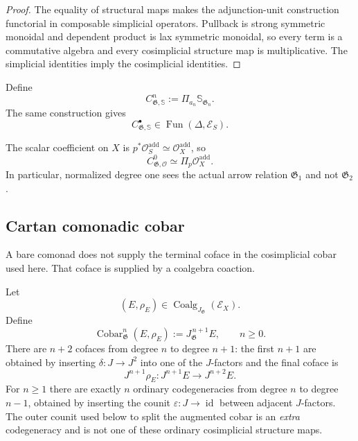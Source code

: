 \begin{proof}
The equality of structural maps makes the adjunction-unit construction
functorial in composable simplicial operators.  Pullback is strong symmetric
monoidal and dependent product is lax symmetric monoidal, so every term is a
commutative algebra and every cosimplicial structure map is multiplicative.
The simplicial identities imply the cosimplicial identities.
\end{proof}

\begin{definition}
\label{def:as-geometric-spherical}
Define
\[
    C_{\mathfrak G,\mathbb S}^{n}
    :=
    \Pi_{a_n}\mathbb S_{\mathfrak G_n}.
\]
The same construction gives
\[
    C_{\mathfrak G,\mathbb S}^{\bullet}
    \in
    \operatorname{Fun}(\Delta,\mathcal E_S).
\]
\end{definition}

The scalar coefficient on $X$ is
$p^*\mathcal O_S^{\mathrm{add}}\simeq\mathcal O_X^{\mathrm{add}}$, so
\[
    C_{\mathfrak G,\mathcal O}^{0}
    \simeq
    \Pi_p\mathcal O_X^{\mathrm{add}}.
\]
In particular, normalized degree one sees the actual arrow relation
$\mathfrak G_1$ and not $\mathfrak G_2$.

\subsection{Cartan comonadic cobar}

A bare comonad does not supply the terminal coface in the cosimplicial cobar
used here.  That coface is supplied by a coalgebra coaction.

\begin{definition}
\label{def:as-cartan-cobar}
Let
\[
    (E,\rho_E)
    \in
    \operatorname{Coalg}_{J_{\mathfrak G}}(\mathcal E_X).
\]
Define
\[
\boxed{
    \operatorname{Cobar}_{\mathfrak G}^{n}(E,\rho_E)
    :=
    J_{\mathfrak G}^{\,n+1}E,
    \qquad
    n\geq0.
}
\]
There are $n+2$ cofaces from degree $n$ to degree $n+1$: the first
$n+1$ are obtained by inserting
$\delta:J\to J^2$ into one of the $J$-factors and the final coface is
\[
    J^{n+1}\rho_E:
    J^{n+1}E\longrightarrow J^{n+2}E.
\]
For $n\geq1$ there are exactly $n$ ordinary codegeneracies from degree $n$
to degree $n-1$, obtained by inserting the counit
$\varepsilon:J\to\operatorname{id}$ between adjacent $J$-factors.  The
outer counit used below to split the augmented cobar is an \emph{extra}
codegeneracy and is not one of these ordinary cosimplicial structure maps.
\end{definition}

